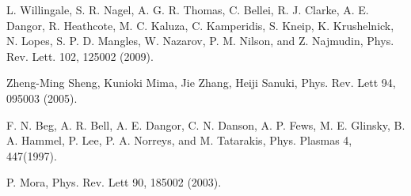 \documentclass[aip,twocolumn,superscriptaddress,showpacs,amsmath]{revtex4}
\begin{document}
\begin{thebibliography}{28}
L. Willingale, S. R. Nagel, A. G. R. Thomas, C. Bellei, R. J. Clarke, 
A. E. Dangor, R. Heathcote, M. C. Kaluza, C. Kamperidis, S. Kneip, 
K. Krushelnick, N. Lopes, S. P. D. Mangles, W. Nazarov, P. M. Nilson, and
Z. Najmudin, Phys. Rev. Lett. 102, 125002 (2009).




Zheng-Ming Sheng, Kunioki Mima, Jie Zhang, Heiji Sanuki, Phys. Rev. Lett 94, 095003 (2005).

 F. N. Beg, A. R. Bell, A. E. Dangor, C. N. Danson, A. P. Fews, M. E.
Glinsky, B. A. Hammel, P. Lee, P. A. Norreys, and M. Tatarakis,
Phys. Plasmas 4, 447(1997).

 P. Mora, Phys. Rev. Lett 90, 185002 (2003).

\end{thebibliography}
\end{document}
